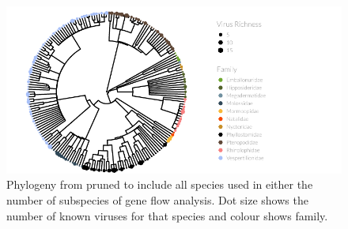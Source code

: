 
































\begin{knitrout}\footnotesize
{}\color{fgcolor}\begin{figure}[t]

{\centering \includegraphics[width=1.2\textwidth]{figure/treePlot-1} 

}

\caption[Pruned phylogeny with dot size showing number of pathogens and colour showing family.]{
Phylogeny from \cite{bininda2007delayed} pruned to include all species used in either the number of subspecies of gene flow analysis.
Dot size shows the number of known viruses for that species and colour shows family.
}\label{fig:treePlot}
\end{figure}


\end{knitrout}



